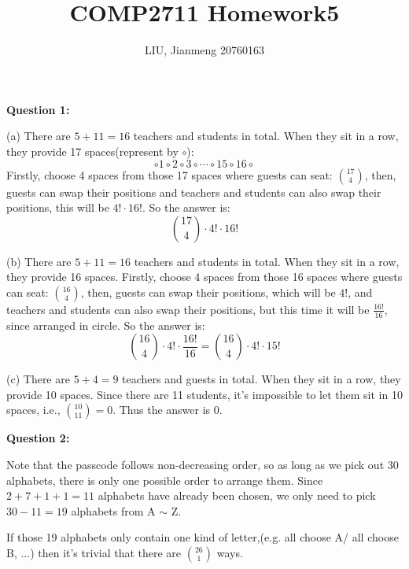 \documentclass[a4paper,11pt]{article}
\title{\textbf{COMP2711} Homework5}
\author{LIU, Jianmeng 20760163}
\date{}
\begin{document}
    \maketitle

    \begin{spacing}{1.4}

    \setlength{\parindent}{0em}

    \textbf{Question 1:}

    (a) There are $5+11=16$ teachers and students in total. When they
    sit in a row, they provide 17 spaces(represent by $\circ$):
    $$\circ 1 \circ 2 \circ 3 \circ \cdots \circ 15 \circ 16 \circ$$
    Firstly, choose 4 spaces from those 17 spaces where guests can seat:
    ${17\choose 4}$, then, guests can swap their positions and teachers and
    students can also swap their positions, this will be $4!\cdot 16!$.
    So the answer is:
    $${17\choose 4}\cdot 4!\cdot 16!$$

    \vspace{5pt}

    (b) There are $5+11=16$ teachers and students in total. When they
    sit in a row, they provide 16 spaces. 
    Firstly, choose 4 spaces from those 16 spaces where guests can seat:
    ${16\choose 4}$, then, guests can swap their positions, which will 
    be $4!$, and teachers and students can also swap their positions, 
    but this time it will be $\frac{16!}{16}$, since arranged in circle.
    So the answer is:
    $${16\choose 4}\cdot 4!\cdot \frac{16!}{16}={16\choose 4}\cdot 4!\cdot 15!$$

    \vspace{5pt}

    (c) There are $5+4=9$ teachers and guests in total. When they
    sit in a row, they provide 10 spaces. Since there are 11 students,
    it's impossible to let them sit in 10 spaces, i.e., 
    ${10\choose 11}=0$. Thus the answer is 0.

    
    \vspace{20pt}

    \textbf{Question 2:}

    \hspace{2em}
    Note that the passcode follows non-decreasing order, so as long as
    we pick out 30 alphabets, there is only one possible order
    to arrange them. Since $2+7+1+1=11$ alphabets have already been 
    chosen, we only need to pick $30-11=19$ alphabets from A $\sim $ Z.

    \hspace{2em}
    If those 19 alphabets only contain one kind of letter,(e.g. 
    all choose A/ all choose B, ...) then it's trivial that
    there are ${26\choose 1}$ ways.


\end{spacing}
\end{document}
